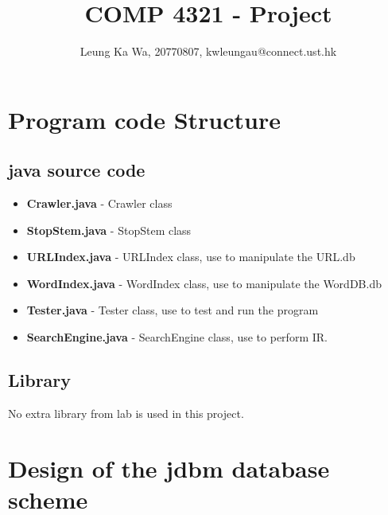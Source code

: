 \documentclass{article}
\title{COMP 4321 - Project}
\author{Leung Ka Wa, 20770807, kwleungau@connect.ust.hk}
\date{}
\begin{document}
    \maketitle
    \section*{Program code Structure}
        \subsection*{java source code}
            \begin{itemize}
                \item \textbf{Crawler.java} - Crawler class
                \item \textbf{StopStem.java} - StopStem class
                \item \textbf{URLIndex.java} - URLIndex class, use to manipulate the URL.db
                \item \textbf{WordIndex.java} - WordIndex class, use to manipulate the WordDB.db
                \item \textbf{Tester.java} - Tester class, use to test and run the program
                \item \textbf{SearchEngine.java} - SearchEngine class, use to perform IR.
            \end{itemize}
        \subsection*{Library}
            No extra library from lab is used in this project.

    \section*{Design of the jdbm database scheme}
\end{document}
